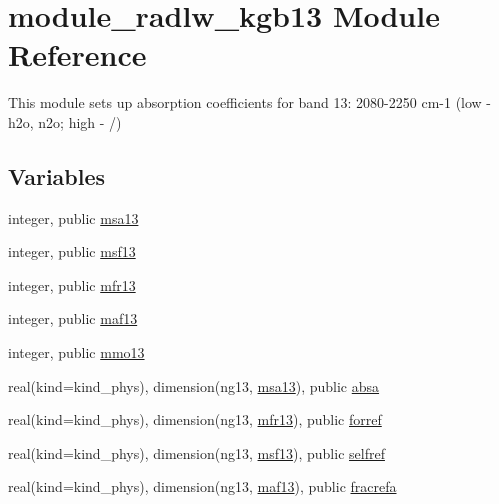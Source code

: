 \hypertarget{namespacemodule__radlw__kgb13}{}\section{module\+\_\+radlw\+\_\+kgb13 Module Reference}
\label{namespacemodule__radlw__kgb13}


This module sets up absorption coefficients for band 13\+: 2080-\/2250 cm-\/1 (low -\/ h2o, n2o; high -\/ /)  


\subsection*{Variables}
\begin{DoxyCompactItemize}
\item 
integer, public \hyperlink{namespacemodule__radlw__kgb13_a07932a22e5f8de248765a207e170ce6f}{msa13}
\item 
integer, public \hyperlink{namespacemodule__radlw__kgb13_a7f88590d2a9fc392b04e89fd3d4bf2bf}{msf13}
\item 
integer, public \hyperlink{namespacemodule__radlw__kgb13_a158782c955af9f50aaefea2d49af97ce}{mfr13}
\item 
integer, public \hyperlink{namespacemodule__radlw__kgb13_a1ddc025df872b12194b8c6344cc0204e}{maf13}
\item 
integer, public \hyperlink{namespacemodule__radlw__kgb13_ae513ce55829a57a0dbda77f570e4a619}{mmo13}
\item 
real(kind=kind\+\_\+phys), dimension(ng13, \hyperlink{namespacemodule__radlw__kgb13_a07932a22e5f8de248765a207e170ce6f}{msa13}), public \hyperlink{namespacemodule__radlw__kgb13_a22ce8d48ac3dceae1d52e80097fc2689}{absa}
\item 
real(kind=kind\+\_\+phys), dimension(ng13, \hyperlink{namespacemodule__radlw__kgb13_a158782c955af9f50aaefea2d49af97ce}{mfr13}), public \hyperlink{namespacemodule__radlw__kgb13_a93c6546ef5f8cbfc4f63de29e1ba2452}{forref}
\item 
real(kind=kind\+\_\+phys), dimension(ng13, \hyperlink{namespacemodule__radlw__kgb13_a7f88590d2a9fc392b04e89fd3d4bf2bf}{msf13}), public \hyperlink{namespacemodule__radlw__kgb13_ac8f58bba6aa4b72ffd01f78e60d0831f}{selfref}
\item 
real(kind=kind\+\_\+phys), dimension(ng13, \hyperlink{namespacemodule__radlw__kgb13_a1ddc025df872b12194b8c6344cc0204e}{maf13}), public \hyperlink{namespacemodule__radlw__kgb13_a82aed8a05cd528b287e336f7ff8fcebb}{fracrefa}

\end{DoxyCompactItemize}
